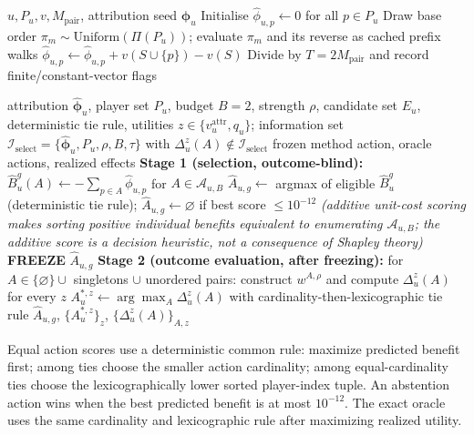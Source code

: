 \documentclass[pdflatex,sn-mathphys-num]{sn-jnl}
\theoremstyle{thmstyleone}
\theoremstyle{thmstyletwo}
\theoremstyle{thmstylethree}
\begin{document}
\begin{algorithm}[t]
\caption{Paired Monte Carlo attribution}
\label{alg:shapley}
\begin{algorithmic}[1]
\Require $u,P_u,v,M_{\mathrm{pair}}$, attribution seed
\Ensure $\widehat{\boldsymbol\phi}_u$
\State Initialise $\hat\phi_{u,p}\gets0$ for all $p\in P_u$
\State Draw base order $\pi_m\sim\mathrm{Uniform}(\Pi(P_u))$; evaluate $\pi_m$ and its reverse as cached prefix walks
\State $\hat\phi_{u,p}\gets\hat\phi_{u,p}+v(S\cup\{p\})-v(S)$
\EndFor
\EndFor
\State Divide by $T=2M_{\mathrm{pair}}$ and record finite/constant-vector flags
\end{algorithmic}
\end{algorithm}

\begin{algorithm}[t]
\caption{Leakage-free signed action selection and exact budget-two oracle}
\label{alg:actions}
\begin{algorithmic}[1]
\Require attribution $\hat{\boldsymbol\phi}_u$, player set $P_u$, budget $B=2$, strength $\rho$, candidate set $E_u$, deterministic tie rule, utilities $z\in\{v_u^{\mathrm{attr}},q_u\}$; information set $\mathcal I_{\mathrm{select}}=\{\hat{\boldsymbol\phi}_u,P_u,\rho,B,\tau\}$ with $\Delta_u^z(A)\notin\mathcal I_{\mathrm{select}}$
\Ensure frozen method action, oracle actions, realized effects
\State \textbf{Stage 1 (selection, outcome-blind):} $\widehat B_u^g(A)\gets-\sum_{p\in A}\hat\phi_{u,p}$ for $A\in\mathcal A_{u,B}$
\State $\widehat A_{u,g}\gets$ argmax of eligible $\widehat B_u^g$ (deterministic tie rule); $\widehat A_{u,g}\gets\varnothing$ if best score $\le10^{-12}$
\Statex\hspace{1em}\textit{(additive unit-cost scoring makes sorting positive individual benefits equivalent to enumerating $\mathcal A_{u,B}$; the additive score is a decision heuristic, not a consequence of Shapley theory)}
\State \textbf{FREEZE} $\widehat A_{u,g}$
\State \textbf{Stage 2 (outcome evaluation, after freezing):} for $A\in\{\varnothing\}\cup$ singletons $\cup$ unordered pairs: construct $w^{A,\rho}$ and compute $\Delta_u^z(A)$ for every $z$
\State $A_u^{*,z}\gets\arg\max_A\Delta_u^z(A)$ with cardinality-then-lexicographic tie rule
\State \Return $\widehat A_{u,g}$, $\{A_u^{*,z}\}_z$, $\{\Delta_u^z(A)\}_{A,z}$
\end{algorithmic}
\end{algorithm}

Equal action scores use a deterministic common rule: maximize predicted benefit first; among ties choose the smaller action cardinality; among equal-cardinality ties choose the lexicographically lower sorted player-index tuple. An abstention action wins when the best predicted benefit is at most $10^{-12}$. The exact oracle uses the same cardinality and lexicographic rule after maximizing realized utility.
\end{document}
